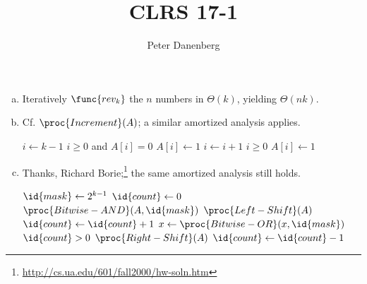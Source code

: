 \documentclass{article}
\author{Peter Danenberg}
\title{CLRS 17-1}
\begin{document}
\maketitle
\begin{enumerate}[a.]
\item Iteratively $\func{rev_k}$ the $n$ numbers in $\Theta(k)$,
  yielding $\Theta(nk)$.
\item Cf. $\proc{Increment}(A)$; a similar amortized analysis applies.
  \begin{codebox}
    \li $i \gets k - 1$
    \li \While $i \geq 0$ and $A[i] = 0$
    \li \Do
    $A[i] \gets 1$
    \li $i \gets i + 1$
    \End
    \li \If $i \geq 0$
    \li \Then
    $A[i] \gets 1$
  \End
  \end{codebox}
\item Thanks, Richard
  Borie;\footnote{\url{http://cs.ua.edu/601/fall2000/hw-soln.htm}} the
  same amortized analysis still holds.
  \begin{codebox}
    \li $\id{mask} \gets 2^{k-1}$
    \li $\id{count} \gets 0$
    \li \While $\proc{Bitwise-AND}(A, \id{mask})$
    \li \Do
    $\proc{Left-Shift}(A)$
    \li $\id{count} \gets \id{count} + 1$
    \End
    \li $x \gets \proc{Bitwise-OR}(x, \id{mask})$
    \li \While $\id{count} > 0$
    \li \Do
    $\proc{Right-Shift}(A)$
    \li $\id{count} \gets \id{count} - 1$
    \End
  \end{codebox}
\end{enumerate}
\end{document}
